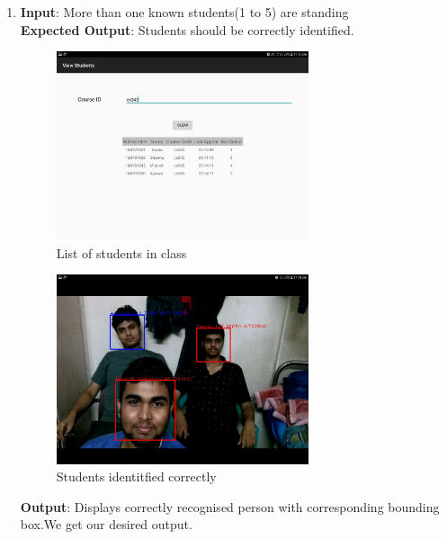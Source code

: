 \documentclass{scrreprt}
\begin{document}
\begin{itemize}
\begin{enumerate}
\item \textbf{Input}: More than one known students(1 to 5) are standing\\
\textbf{Expected Output}: Students should be correctly identified.
\begin{figure}[H]
\centering
\includegraphics[width=0.7\textwidth, keepaspectratio]{camstate.jpg}
\caption{List of students in class}
\end{figure}
\begin{figure}[H]
\centering
\includegraphics[width=0.7\textwidth, keepaspectratio]{cam3stud.jpg}
\caption{Students identitfied correctly}
\end{figure}
\textbf{Output}: Displays correctly recognised person with corresponding bounding box.We get our desired output.


\end{enumerate}
\end{itemize}
\end{document}
